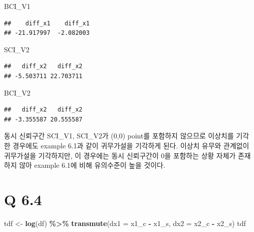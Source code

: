 \documentclass[
]{article}
\newenvironment{Shaded}{\begin{snugshade}}{\end{snugshade}}
\newcommand{\AttributeTok}[1]{\textcolor[rgb]{0.13,0.29,0.53}{#1}}
\newcommand{\FunctionTok}[1]{\textcolor[rgb]{0.13,0.29,0.53}{\textbf{#1}}}
\newcommand{\NormalTok}[1]{#1}
\newcommand{\OtherTok}[1]{\textcolor[rgb]{0.56,0.35,0.01}{#1}}
\newcommand{\SpecialCharTok}[1]{\textcolor[rgb]{0.81,0.36,0.00}{\textbf{#1}}}
\begin{document}
\begin{Shaded}
\begin{Highlighting}[]
\NormalTok{BCI\_V1}
\end{Highlighting}
\end{Shaded}

\begin{verbatim}
##    diff_x1    diff_x1 
## -21.917997  -2.082003
\end{verbatim}

\begin{Shaded}
\begin{Highlighting}[]
\NormalTok{SCI\_V2}
\end{Highlighting}
\end{Shaded}

\begin{verbatim}
##   diff_x2   diff_x2 
## -5.503711 22.703711
\end{verbatim}

\begin{Shaded}
\begin{Highlighting}[]
\NormalTok{BCI\_V2}
\end{Highlighting}
\end{Shaded}

\begin{verbatim}
##   diff_x2   diff_x2 
## -3.355587 20.555587
\end{verbatim}

동시 신뢰구간 SCI\_V1, SCI\_V2가 (0,0) point를 포함하지 않으므로
이상치를 기각한 경우에도 example 6.1과 같이 귀무가설을 기각하게 된다.
이상치 유무와 관계없이 귀무가설을 기각하지만, 이 경우에는 동시
신뢰구간이 0을 포함하는 상황 자체가 존재하지 않아 example 6.1에 비해
유의수준이 높을 것이다.

\section{Q 6.4}\label{q-6.4}

\begin{Shaded}
\begin{Highlighting}[]
\NormalTok{tdf }\OtherTok{\textless{}{-}} \FunctionTok{log}\NormalTok{(df) }\SpecialCharTok{\%\textgreater{}\%} \FunctionTok{transmute}\NormalTok{(}\AttributeTok{dx1 =}\NormalTok{ x1\_c }\SpecialCharTok{{-}}\NormalTok{ x1\_s, }\AttributeTok{dx2 =}\NormalTok{ x2\_c }\SpecialCharTok{{-}}\NormalTok{ x2\_s)}
\NormalTok{tdf}
\end{Highlighting}
\end{Shaded}
\end{document}
